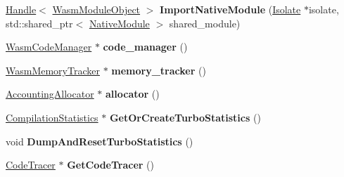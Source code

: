 \begin{DoxyCompactItemize}
\item 
\mbox{\label{classv8_1_1internal_1_1wasm_1_1WasmEngine_ae9574a38d771411fadc441fa58b875cf}} 
\mbox{\hyperlink{classv8_1_1internal_1_1Handle}{Handle}}$<$ \mbox{\hyperlink{classv8_1_1internal_1_1WasmModuleObject}{Wasm\+Module\+Object}} $>$ {\bfseries Import\+Native\+Module} (\mbox{\hyperlink{classv8_1_1internal_1_1Isolate}{Isolate}} $\ast$isolate, std\+::shared\+\_\+ptr$<$ \mbox{\hyperlink{classv8_1_1internal_1_1wasm_1_1NativeModule}{Native\+Module}} $>$ shared\+\_\+module)
\item 
\mbox{\label{classv8_1_1internal_1_1wasm_1_1WasmEngine_ab09e92a7aa8374889c1a6928bab813ed}} 
\mbox{\hyperlink{classv8_1_1internal_1_1wasm_1_1WasmCodeManager}{Wasm\+Code\+Manager}} $\ast$ {\bfseries code\+\_\+manager} ()
\item 
\mbox{\label{classv8_1_1internal_1_1wasm_1_1WasmEngine_a7f0d4c368b7d4cf712a46d022bedec09}} 
\mbox{\hyperlink{classv8_1_1internal_1_1wasm_1_1WasmMemoryTracker}{Wasm\+Memory\+Tracker}} $\ast$ {\bfseries memory\+\_\+tracker} ()
\item 
\mbox{\label{classv8_1_1internal_1_1wasm_1_1WasmEngine_a92bf3bf6d5ba9b15735d9ae1a3643817}} 
\mbox{\hyperlink{classv8_1_1internal_1_1AccountingAllocator}{Accounting\+Allocator}} $\ast$ {\bfseries allocator} ()
\item 
\mbox{\label{classv8_1_1internal_1_1wasm_1_1WasmEngine_a6ba64d2431a10ea5ff7a0c33cf8a03f8}} 
\mbox{\hyperlink{classv8_1_1internal_1_1CompilationStatistics}{Compilation\+Statistics}} $\ast$ {\bfseries Get\+Or\+Create\+Turbo\+Statistics} ()
\item 
\mbox{\label{classv8_1_1internal_1_1wasm_1_1WasmEngine_a54471342125fa1a1edbfce3cbabc9ab6}} 
void {\bfseries Dump\+And\+Reset\+Turbo\+Statistics} ()
\item 
\mbox{\label{classv8_1_1internal_1_1wasm_1_1WasmEngine_a935fb8d614cf2741a9b6bb23671b0e76}} 
\mbox{\hyperlink{classv8_1_1internal_1_1CodeTracer}{Code\+Tracer}} $\ast$ {\bfseries Get\+Code\+Tracer} ()

\end{DoxyCompactItemize}
